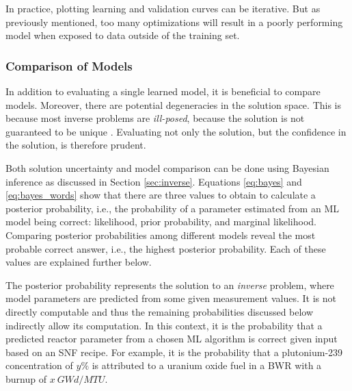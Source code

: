 In practice, plotting learning and validation curves can be iterative. But as
previously mentioned, too many optimizations will result in a poorly performing
model when exposed to data outside of the training set.

\subsubsection{Comparison of Models}
\label{sec:invcompare}

In addition to evaluating a single learned model, it is beneficial to compare
models. Moreover, there are potential degeneracies in the solution space. This
is because most inverse problems are \textit{ill-posed}, because the solution
is not guaranteed to be unique \cite{skutnik_2016}.  Evaluating not only the
solution, but the confidence in the solution, is therefore prudent.

Both solution uncertainty and model comparison can be done using Bayesian
inference as discussed in Section \ref{sec:inverse}.  Equations \ref{eq:bayes}
and \ref{eq:bayes_words} show that there are three values to obtain to
calculate a posterior probability, i.e., the probability of a parameter
estimated from an \gls{ML} model being correct: likelihood, prior
probability, and marginal likelihood.  Comparing posterior probabilities among
different models reveal the most probable correct answer, i.e., the highest
posterior probability.  \cite{inverse_theory, gentle_bayes} Each of these
values are explained further below.

The posterior probability represents the solution to an \textit{inverse}
problem, where model parameters are predicted from some given measurement
values. It is not directly computable and thus the remaining probabilities
discussed below indirectly allow its computation.  In this context, it is the
probability that a predicted reactor parameter from a chosen \gls{ML}
algorithm is correct given input based on an \gls{SNF} recipe.  For example, it
is the probability that a plutonium-239 concentration of $y\%$ is attributed to
a uranium oxide fuel in a \gls{BWR} with a burnup of $x\ GWd/MTU$.  

